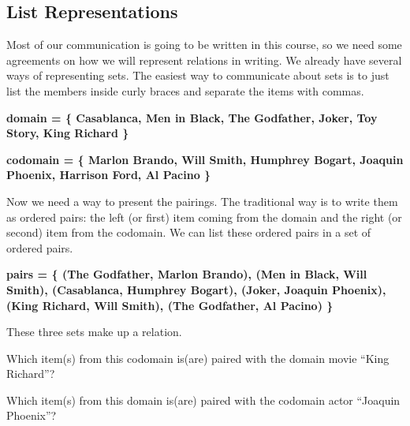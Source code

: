 \documentclass{ximera}
\begin{document}
\subsection*{List Representations}

Most of our communication is going to be written in this course, so we need some agreements on how we will represent relations in writing.  We already have several ways of representing sets.  The easiest way to communicate about sets is to just list the members inside curly braces and separate the items with commas.

\begin{center} 
\textbf{\textcolor{blue!75!black}{ domain = \{ Casablanca, Men in Black,  The Godfather, Joker, Toy Story, King Richard \} }}
\end{center}

\begin{center} 
\textbf{\textcolor{blue!75!black}{ codomain = \{ Marlon Brando, Will Smith, Humphrey Bogart, Joaquin Phoenix, Harrison Ford, Al Pacino \} }}
\end{center}

Now we need a way to present the pairings.  The traditional way is to write them as ordered pairs: the left (or first) item coming from the domain and the right (or second) item from the codomain.  We can list these ordered pairs in a set of ordered pairs. 

\begin{center} 
\textbf{\textcolor{blue!75!black}{ pairs = \{ (The Godfather, Marlon Brando), (Men in Black, Will Smith), (Casablanca, Humphrey Bogart), (Joker, Joaquin Phoenix), (King Richard, Will Smith), (The Godfather, Al Pacino) \}  }}
\end{center}


These three sets make up a relation. 



\begin{question}

Which item(s) from this codomain is(are) paired with the domain movie ``King Richard''?
\begin{selectAll}
\end{selectAll}

\end{question}



\begin{question}

Which item(s) from this domain is(are) paired with the codomain actor ``Joaquin Phoenix''?
\begin{selectAll}
\end{selectAll}

\end{question}
\end{document}
